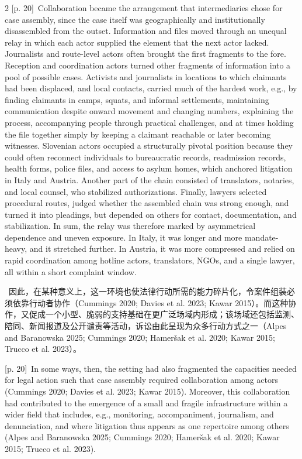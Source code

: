 \documentclass[10pt,a4paper]{article}
\begin{document}
\begin{paracol}{2}
\switchcolumn
{\scriptsize\color{gray} [p. 20]}\ Collaboration became the arrangement that intermediaries chose for case assembly, since the case itself was geographically and institutionally disassembled from the outset. Information and files moved through an unequal relay in which each actor supplied the element that the next actor lacked. Journalists and route-level actors often brought the first fragments to the fore. Reception and coordination actors turned other fragments of information into a pool of possible cases. Activists and journalists in locations to which claimants had been displaced, and local contacts, carried much of the hardest work, e.g., by finding claimants in camps, squats, and informal settlements, maintaining communication despite onward movement and changing numbers, explaining the process, accompanying people through practical challenges, and at times holding the file together simply by keeping a claimant reachable or later becoming witnesses. Slovenian actors occupied a structurally pivotal position because they could often reconnect individuals to bureaucratic records, readmission records, health forms, police files, and access to asylum homes, which anchored litigation in Italy and Austria. Another part of the chain consisted of translators, notaries, and local counsel, who stabilized authorizations. Finally, lawyers selected procedural routes, judged whether the assembled chain was strong enough, and turned it into pleadings, but depended on others for contact, documentation, and stabilization. In sum, the relay was therefore marked by asymmetrical dependence and uneven exposure. In Italy, it was longer and more mandate-heavy, and it stretched further. In Austria, it was more compressed and relied on rapid coordination among hotline actors, translators, NGOs, and a single lawyer, all within a short complaint window.\par
\switchcolumn*
{\scriptsize\color{gray} [p. 20]}\ 因此，在某种意义上，这一环境也使法律行动所需的能力碎片化，令案件组装必须依靠行动者协作（Cummings 2020; Davies et al. 2023; Kawar 2015）。而这种协作，又促成一个小型、脆弱的支持基础在更广泛场域内形成；该场域还包括监测、陪同、新闻报道及公开谴责等活动，诉讼由此呈现为众多行动方式之一（Alpes and Baranowska 2025; Cummings 2020; Hameršak et al. 2020; Kawar 2015; Trucco et al. 2023）。\par
\switchcolumn
{\scriptsize\color{gray} [p. 20]}\ In some ways, then, the setting had also fragmented the capacities needed for legal action such that case assembly required collaboration among actors (Cummings 2020; Davies et al. 2023; Kawar 2015). Moreover, this collaboration had contributed to the emergence of a small and fragile infrastructure within a wider field that includes, e.g., monitoring, accompaniment, journalism, and denunciation, and where litigation thus appears as one repertoire among others (Alpes and Baranowska 2025; Cummings 2020; Hameršak et al. 2020; Kawar 2015; Trucco et al. 2023).\par

\end{paracol}
\end{document}
